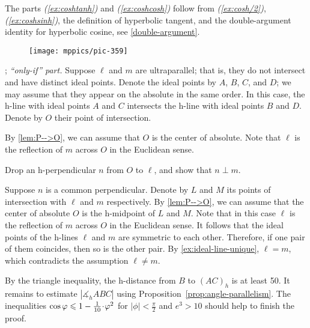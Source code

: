 The parts \textit{(\ref{ex:coshtanh})} and \textit{(\ref{ex:coshcosh})} follow from \textit{(\ref{ex:cosh/2})}, \textit{(\ref{ex:coshsinh})}, the definition of hyperbolic tangent, and the double-argument identity for hyperbolic cosine, see \ref{double-argument}.



\setcounter{eqtn}{0}

{

\begin{wrapfigure}{r}{34mm}
\vskip-5mm
\centering
\texttt{[image: mppics/pic-359]}
\end{wrapfigure}

\parbf{\ref{ex:ultra-parallel}}; \textit{``only-if'' part.} Suppose $\ell$ and $m$ are ultraparallel; that is, they do not intersect and have distinct ideal points.
Denote the ideal points by $A$, $B$, $C$, and $D$;
we may assume that they appear on the absolute in the same order.
In this case, the h-line with ideal points $A$ and $C$ intersects the h-line with ideal points $B$ and $D$.
Denote by $O$ their point of intersection.

By \ref{lem:P-->O}, we can assume that $O$ is the center of absolute.
Note that $\ell$ is the reflection of $m$ across $O$ in the Euclidean sense.

}

Drop an h-perpendicular $n$ from $O$ to $\ell$, and
show that $n\perp m$.


Suppose $n$ is a common perpendicular.
Denote by $L$ and $M$ its points of intersection with $\ell$ and $m$ respectively.
By \ref{lem:P-->O}, we can assume that the center of absolute $O$ is the h-midpoint of $L$ and $M$.
Note that in this case $\ell$ is the reflection of $m$ across $O$ in the Euclidean sense.
It follows that the ideal points of the h-lines $\ell$ and $m$ are symmetric to each other.
Therefore, if one pair of them coincides, then so is the other pair. 
By \ref{ex:ideal-line-unique}, $\ell=m$, which contradicts the assumption $\ell\ne m$.



By the triangle inequality, the h-distance from $B$ to $(AC)_h$ is at least 50.
It remains to estimate $|\measuredangle_h ABC|$ using Proposition~\ref{prop:angle-parallelism}.
The inequalities $\cos\phi\z\le 1-\tfrac1{10}\cdot\phi^2$ for $|\phi|<\tfrac\pi2$ and $e^3>10$ should help to finish the proof.

